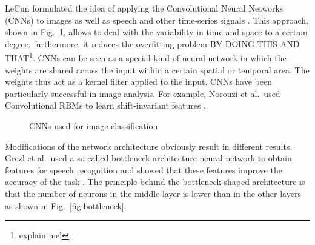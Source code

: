 \documentclass{article}
\begin{document}
LeCun formulated the idea of applying the Convolutional Neural Networks (CNNs) to images as well as speech and other time-series signals \cite{lecun1995convolutional}. This approach, shown in Fig.~\ref{fig:cnn}, allows to deal with the variability in time and space to a certain degree; furthermore, it reduces the overfitting problem BY DOING THIS AND THAT\footnote{explain me!}. CNNs can be seen as a special kind of neural network in which the weights are shared across the input within a certain spatial or temporal area. The weights thus act as a kernel filter applied to the input. CNNs have been particularly successful in image analysis. For example, Norouzi et al.\ used Convolutional RBMs to learn shift-invariant features \cite{norouzi2009stacks}. 
\begin{figure}
 \centerline{}
 \caption{CNNs used for image classification}
 \label{fig:cnn}
\end{figure}
Modifications of the network architecture obviously result in different results. Grezl et al.\ used a so-called bottleneck architecture neural network to obtain features for speech recognition and showed that these features improve the accuracy of the task \cite{grezl2007probabilistic}. The principle behind the bottleneck-shaped architecture is that the number of neurons in the middle layer is lower than in the other layers as shown in Fig.~\ref{fig:bottleneck}.
\end{document}
